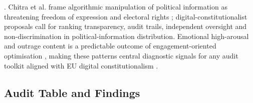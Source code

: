 \documentclass[11pt]{article}
\begin{document}
\parencites[7]{6502223}. Chitra et al. frame algorithmic manipulation of political information as threatening freedom of expression and electoral rights \parencites[11]{6502223}; digital-constitutionalist proposals call for ranking transparency, audit trails, independent oversight and non-discrimination in political-information distribution. Emotional high-arousal and outrage content is a predictable outcome of engagement-oriented optimisation \parencites[7]{6502223}[3]{3303310}[2]{7154741}, making these patterns central diagnostic signals for any audit toolkit aligned with EU digital constitutionalism \parencites[7]{6502223}[11]{6502223}[3]{3303310}.

\subsection{Audit Table and Findings}
\end{document}
